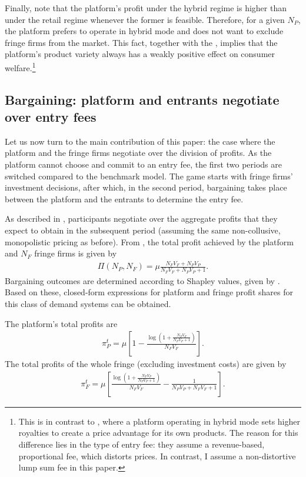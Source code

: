 Finally, note that the platform's profit under the hybrid regime is higher than under the retail regime whenever the former is feasible.
Therefore, for a given $N_P$, the platform prefers to operate in hybrid mode and does not want to exclude fringe firms from the market.
This fact, together with the , implies that the platform's product variety always has a weakly positive effect on consumer welfare.\footnote{
    This is in contrast to \textcite{anderson2021hybrid}, where a platform operating in hybrid mode sets higher royalties to create a price advantage for its own products.
    The reason for this difference lies in the type of entry fee: they assume a revenue-based, proportional fee, which distorts prices.
    In contrast, I assume a non-distortive lump sum fee in this paper.
}

\subsection{Bargaining: platform and entrants negotiate over entry fees}

Let us now turn to the main contribution of this paper: the case where the platform and the fringe firms negotiate over the division of profits.
As the platform cannot choose and commit to an entry fee, the first two periods are switched compared to the benchmark model.
The game starts with fringe firms' investment decisions, after which, in the second period, bargaining takes place between the platform and the entrants to determine the entry fee.

As described in , participants negotiate over the aggregate profits that they expect to obtain in the subsequent period (assuming the same non-collusive, monopolistic pricing as before).
From , the total profit achieved by the platform and $N_F$ fringe firms is given by
\begin{align}
    \Pi(N_P, N_F) = \mu \frac{N_F V_F + N_P V_P}{N_F V_F + N_P V_P + 1}.  \label{eq:total_profits}
\end{align}
Bargaining outcomes are determined according to Shapley values, given by .
Based on these, closed-form expressions for platform and fringe profit shares for this class of demand systems can be obtained.
\begin{proposition}
    \label{prop:platform_profits_bargaining}
    The platform's total profits are
    \begin{align*}
        \pi^t_P = \mu \left[ 1 - \frac{\log \left(1 + \frac{N_F V_F}{N_P V_P + 1} \right)}{N_F V_F} \right].
    \end{align*}
    The total profits of the whole fringe (excluding investment costs) are given by
    \begin{align*}
        \pi^t_F = \mu \left[ \frac{\log \left( 1 + \frac{N_F V_F}{N_P V_P + 1} \right)}{N_F V_F} - \frac{1}{N_P V_P + N_F V_F + 1} \right].
    \end{align*}
\end{proposition}

